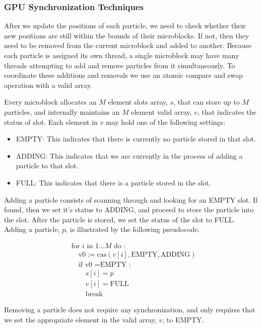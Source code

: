 \documentclass[11pt]{article} %
\begin{document}
\subsubsection{GPU Synchronization Techniques}
After we update the positions of each particle, we need to check whether
their new positions are still within the bounds of their microblocks.
If not, then they need to be removed from the current microblock and
added to another. Because each particle is assigned its own thread,
a single microblock may have many threads attempting to add and remove
particles from it simultaneously. To coordinate these additions and
removals we use an atomic compare and swap operation with a valid
array.

Every microblock allocates an $M$ element slots array, $s$, that
can store up to $M$ particles, and internally maintains an $M$ element
valid array, $v$, that indicates the status of slot. Each element
in $v$ may hold one of the following settings:
\begin{itemize}
\item EMPTY: This indicates that there is currently no particle stored in
that slot.
\item ADDING: This indicates that we are currently in the process of adding
a particle to that slot.
\item FULL: This indicates that there is a particle stored in the slot.
\end{itemize}
Adding a particle consists of scanning through and looking for an
EMPTY slot. If found, then we set it's status to ADDING, and proceed
to store the particle into the slot. After the particle is stored,
we set the status of the slot to FULL. Adding a particle, $p$, is
illustrated by the following pseudocode.

\[
\begin{aligned} & \text{for }i\text{ in }1\ldots M\text{ do :}\\
 & \quad\text{v0}:=\text{cas}(v[i],\text{EMPTY},\text{ADDING})\\
 & \quad\text{if v0 }=\text{EMPTY :}\\
 & \quad\quad s[i]=p\\
 & \quad\quad v[i]=\text{FULL}\\
 & \quad\quad\text{break}
\end{aligned}
\]


Removing a particle does not require any synchronization, and only
requires that we set the appropriate element in the valid array, $v$,
to EMPTY.
\end{document}
